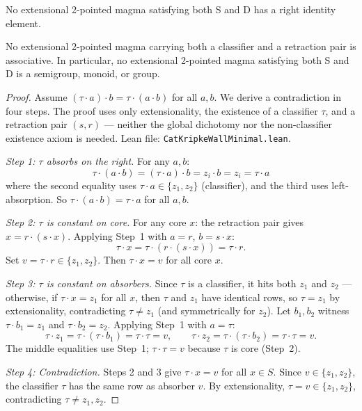 \documentclass[sigconf,screen,review,anonymous]{acmart}
\newcommand{\dotop}{\cdot}
\begin{document}
\begin{theorem}
\label{thm:no-rid}
No extensional 2-pointed magma satisfying both S and D has a right identity element.
\end{theorem}

\begin{theorem}[No Associativity]
\label{thm:no-assoc}
No extensional 2-pointed magma carrying both a classifier and a retraction pair is associative. In particular, no extensional 2-pointed magma satisfying both S and D is a semigroup, monoid, or group.
\end{theorem}

\begin{proof}
Assume $(\tau \dotop a) \dotop b = \tau \dotop (a \dotop b)$ for all $a, b$. We derive a contradiction in four steps. The proof uses only extensionality, the existence of a classifier $\tau$, and a retraction pair $(s, r)$ — neither the global dichotomy nor the non-classifier existence axiom is needed. Lean file: \texttt{CatKripkeWallMinimal.lean}.

\emph{Step 1: $\tau$ absorbs on the right.} For any $a, b$:
\[
\tau \dotop (a \dotop b)
= (\tau \dotop a) \dotop b
= z_i \dotop b
= z_i
= \tau \dotop a
\]
where the second equality uses $\tau \dotop a \in \{z_1, z_2\}$ (classifier), and the third uses left-absorption. So $\tau \dotop (a \dotop b) = \tau \dotop a$ for all $a, b$.

\emph{Step 2: $\tau$ is constant on core.} For any core $x$: the retraction pair gives $x = r \dotop (s \dotop x)$. Applying Step~1 with $a = r$, $b = s \dotop x$:
\[
\tau \dotop x = \tau \dotop (r \dotop (s \dotop x)) = \tau \dotop r.
\]
Set $v = \tau \dotop r \in \{z_1, z_2\}$. Then $\tau \dotop x = v$ for all core $x$.

\emph{Step 3: $\tau$ is constant on absorbers.} Since $\tau$ is a classifier, it hits both $z_1$ and $z_2$ — otherwise, if $\tau \dotop x = z_1$ for all $x$, then $\tau$ and $z_1$ have identical rows, so $\tau = z_1$ by extensionality, contradicting $\tau \neq z_1$ (and symmetrically for $z_2$). Let $b_1, b_2$ witness $\tau \dotop b_1 = z_1$ and $\tau \dotop b_2 = z_2$. Applying Step~1 with $a = \tau$:
\[
\tau \dotop z_1 = \tau \dotop (\tau \dotop b_1) = \tau \dotop \tau = v,
\qquad
\tau \dotop z_2 = \tau \dotop (\tau \dotop b_2) = \tau \dotop \tau = v.
\]
The middle equalities use Step~1; $\tau \dotop \tau = v$ because $\tau$ is core (Step~2).

\emph{Step 4: Contradiction.} Steps 2 and 3 give $\tau \dotop x = v$ for all $x \in S$. Since $v \in \{z_1, z_2\}$, the classifier $\tau$ has the same row as absorber $v$. By extensionality, $\tau = v \in \{z_1, z_2\}$, contradicting $\tau \neq z_1, z_2$.
\end{proof}
\end{document}
